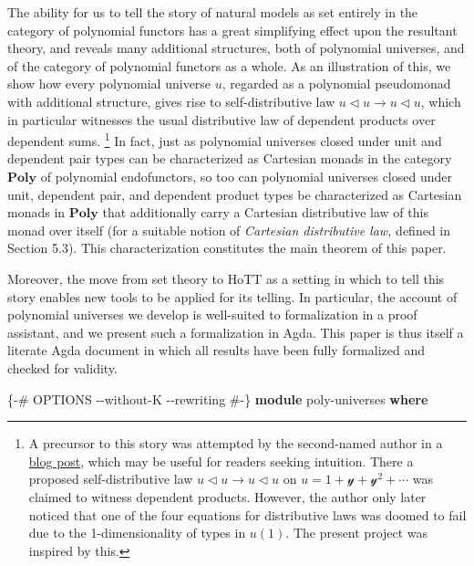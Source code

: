 \documentclass[
  11pt,
  oneside,
  article]{memoir}
\newenvironment{Shaded}{}{}
\newcommand{\KeywordTok}[1]{\textcolor[rgb]{0.00,0.44,0.13}{\textbf{#1}}}
\newcommand{\NormalTok}[1]{#1}
\newcommand{\PreprocessorTok}[1]{\textcolor[rgb]{0.74,0.48,0.00}{#1}}
\theoremstyle{definition}
\theoremstyle{plain}
\newcommand{\Cat}[1]{\mathbf{#1}}%
\newcommand{\yon}{\mathcal{y}}
\newcommand{\poly}{\Cat{Poly}}
\newcommand{\0}{\textsf{0}}
\newcommand{\1}{\tn{\textsf{1}}}
\newcommand{\tri}{\mathbin{\triangleleft}}
\begin{document}
The ability for us to tell the story of natural models as set entirely
in the category of polynomial functors has a great simplifying effect
upon the resultant theory, and reveals many additional structures, both
of polynomial universes, and of the category of polynomial functors as a
whole. As an illustration of this, we show how every polynomial universe
\(u\), regarded as a polynomial pseudomonad with additional structure,
gives rise to self-distributive law \(u\tri u\to u\tri u\), which in
particular witnesses the usual distributive law of dependent products
over dependent sums.%
\footnote{A precursor to this story was attempted by the second-named author in a \href{https://topos.site/blog/2021-07-01-jump-monads/}{blog post}, which may be useful for readers seeking intuition. There a proposed self-distributive law $u\tri u\to u\tri u$ on $u=1+\yon+\yon^2+\cdots$ was claimed to witness dependent products. However, the author only later noticed that one of the four equations for distributive laws was doomed to fail \cite{zwart2022no} due to the 1-dimensionality of types in $u(1)$. The present project was inspired by this.} %
In fact, just as polynomial universes closed under
unit and dependent pair types can be characterized as Cartesian monads
in the category \(\poly\) of polynomial endofunctors, so too can
polynomial universes closed under unit, dependent pair, and dependent
product types be characterized as Cartesian monads in \(\poly\) that
additionally carry a Cartesian distributive law of this monad over
itself (for a suitable notion of \emph{Cartesian distributive law,}
defined in Section 5.3). This characterization constitutes the main
theorem of this paper.

Moreover, the move from set theory to HoTT as a setting in which to tell
this story enables new tools to be applied for its telling. In
particular, the account of polynomial universes we develop is
well-suited to formalization in a proof assistant, and we present such a
formalization in Agda. This paper is thus itself a literate Agda
document in which all results have been fully formalized and checked for
validity.

\begin{Shaded}
\begin{Highlighting}[]
\PreprocessorTok{\{{-}\# OPTIONS {-}{-}without{-}K {-}{-}rewriting \#{-}\}}
\KeywordTok{module}\NormalTok{ poly{-}universes }\KeywordTok{where}
\end{Highlighting}
\end{Shaded}
\end{document}
